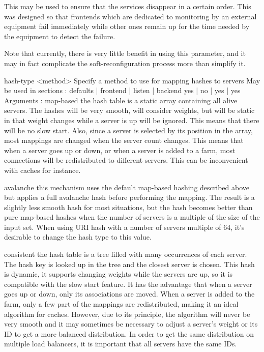   This may be used to ensure that the services disappear in a certain order.
  This was designed so that frontends which are dedicated to monitoring by an
  external equipment fail immediately while other ones remain up for the time
  needed by the equipment to detect the failure.

  Note that currently, there is very little benefit in using this parameter,
  and it may in fact complicate the soft-reconfiguration process more than
  simplify it.


hash-type <method>
  Specify a method to use for mapping hashes to servers
  May be used in sections :   defaults | frontend | listen | backend
                                 yes   |    no    |   yes  |   yes
  Arguments :
    map-based   the hash table is a static array containing all alive servers.
                The hashes will be very smooth, will consider weights, but will
                be static in that weight changes while a server is up will be
                ignored. This means that there will be no slow start. Also,
                since a server is selected by its position in the array, most
                mappings are changed when the server count changes. This means
                that when a server goes up or down, or when a server is added
                to a farm, most connections will be redistributed to different
                servers. This can be inconvenient with caches for instance.

    avalanche   this mechanism uses the default map-based hashing described
                above but applies a full avalanche hash before performing the
                mapping. The result is a slightly less smooth hash for most
                situations, but the hash becomes better than pure map-based
                hashes when the number of servers is a multiple of the size of
                the input set. When using URI hash with a number of servers
                multiple of 64, it's desirable to change the hash type to
                this value.

    consistent  the hash table is a tree filled with many occurrences of each
                server. The hash key is looked up in the tree and the closest
                server is chosen. This hash is dynamic, it supports changing
                weights while the servers are up, so it is compatible with the
                slow start feature. It has the advantage that when a server
                goes up or down, only its associations are moved. When a server
                is added to the farm, only a few part of the mappings are
                redistributed, making it an ideal algorithm for caches.
                However, due to its principle, the algorithm will never be very
                smooth and it may sometimes be necessary to adjust a server's
                weight or its ID to get a more balanced distribution. In order
                to get the same distribution on multiple load balancers, it is
                important that all servers have the same IDs.

